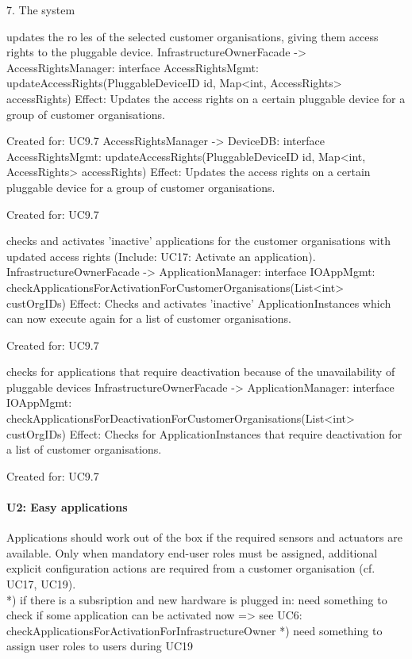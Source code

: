             7. The system
                { updates the roles of the selected customer organisations, giving them access rights to the pluggable device.
                    InfrastructureOwnerFacade -> AccessRightsManager:  interface AccessRightsMgmt: updateAccessRights(PluggableDeviceID id, Map<int, AccessRights> accessRights)
                        Effect: Updates the access rights on a certain pluggable device for a group of customer organisations.
                        \item Created for: UC9.7
                    AccessRightsManager -> DeviceDB:                   interface AccessRightsMgmt: updateAccessRights(PluggableDeviceID id, Map<int, AccessRights> accessRights)
                        Effect: Updates the access rights on a certain pluggable device for a group of customer organisations.
                        \item Created for: UC9.7
                { checks and activates 'inactive' applications for the customer organisations with updated access rights (Include: UC17: Activate an application).
                    InfrastructureOwnerFacade -> ApplicationManager:  interface IOAppMgmt: checkApplicationsForActivationForCustomerOrganisations(List<int> custOrgIDs)
                        Effect: Checks and activates 'inactive' ApplicationInstances which can now execute again for a list of customer organisations.
                        \item Created for: UC9.7
                { checks for applications that require deactivation because of the unavailability of pluggable devices
                    InfrastructureOwnerFacade -> ApplicationManager:  interface IOAppMgmt: checkApplicationsForDeactivationForCustomerOrganisations(List<int> custOrgIDs)
                        Effect: Checks for ApplicationInstances that require deactivation for a list of customer organisations.
                        \item Created for: UC9.7


    \paragraph{U2: Easy applications}
        Applications should work out of the box if the required sensors and
        actuators are available. Only when mandatory end-user roles must be
        assigned, additional explicit configuration actions are required
        from a customer organisation (cf. UC17, UC19). \\
        *) if there is a subsription and new hardware is plugged in: need something to check
           if some application can be activated now => see UC6: checkApplicationsForActivationForInfrastructureOwner
        *) need something to assign user roles to users during UC19

}}}
